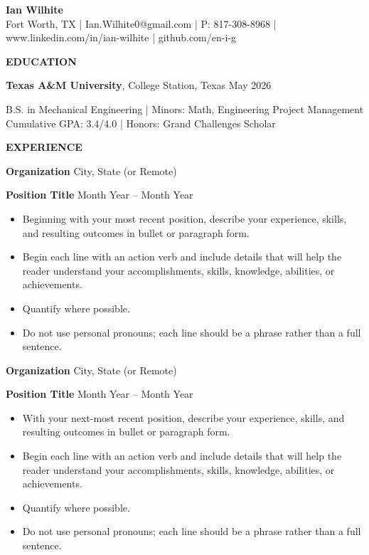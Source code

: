 \documentclass[18pt]{article}
\begin{document}
\begin{center}
    \textbf{Ian Wilhite}\\ 
    {Fort Worth, TX | Ian.Wilhite0@gmail.com | P: 817-308-8968 | www.linkedin.com/in/ian-wilhite | github.com/en-i-g}\\
    
\end{center}

\begin{center}
    \textbf{EDUCATION}
    \hrulefill
\end{center}

\textbf{Texas A\&M University}, College Station, Texas \hfill May 2026

B.S. in Mechanical Engineering\hspace*{2in} | Minors: Math, Engineering Project Management\\
Cumulative GPA: 3.4/4.0\hspace*{2in} | Honors: Grand Challenges Scholar

\begin{center}
    \textbf{EXPERIENCE}
    \hrulefill
\end{center}


\textbf{Organization} \hfill City, State (or Remote)
 
\textbf{Position Title} \hfill Month Year – Month Year
\begin{itemize}[noitemsep]
    \item Beginning with your most recent position, describe your experience, skills, and resulting outcomes in bullet or paragraph form.
    \item Begin each line with an action verb and include details that will help the reader understand your accomplishments, skills, knowledge, abilities, or achievements.
    \item Quantify where possible.
    \item Do not use personal pronouns; each line should be a phrase rather than a full sentence.
\end{itemize}

\vspace{12pt}

\textbf{Organization} \hfill City, State (or Remote)

\textbf{Position Title} \hfill Month Year – Month Year
\begin{itemize}[noitemsep]
    \item With your next-most recent position, describe your experience, skills, and resulting outcomes in bullet or paragraph form.
    \item Begin each line with an action verb and include details that will help the reader understand your accomplishments, skills, knowledge, abilities, or achievements.
    \item Quantify where possible.
    \item Do not use personal pronouns; each line should be a phrase rather than a full sentence.
\end{itemize}
\end{document}
